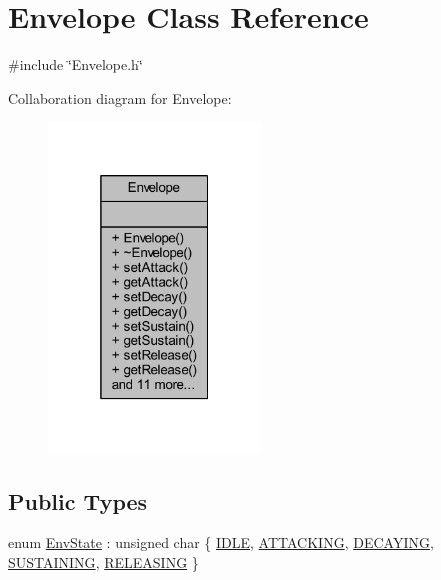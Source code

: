 \hypertarget{class_envelope}{}\section{Envelope Class Reference}
\label{class_envelope}


{\ttfamily \#include \char`\"{}Envelope.\+h\char`\"{}}



Collaboration diagram for Envelope\+:
\nopagebreak
\begin{figure}[H]
\begin{center}
\leavevmode
\includegraphics[width=160pt]{d6/d56/class_envelope__coll__graph}
\end{center}
\end{figure}
\subsection*{Public Types}
\begin{DoxyCompactItemize}
\item 
enum \hyperlink{class_envelope_a16c15d3d555a1a27869f48696f430d5f}{Env\+State} \+: unsigned char \{ \newline
\hyperlink{class_envelope_a16c15d3d555a1a27869f48696f430d5fab143de029e25fdce311f70afa35e5543}{I\+D\+LE}, 
\hyperlink{class_envelope_a16c15d3d555a1a27869f48696f430d5fa95ea9b4e93c89d0cdd585c8722fbfe5b}{A\+T\+T\+A\+C\+K\+I\+NG}, 
\hyperlink{class_envelope_a16c15d3d555a1a27869f48696f430d5fa6aebe1557244f4bfb6ab954708bf03c1}{D\+E\+C\+A\+Y\+I\+NG}, 
\hyperlink{class_envelope_a16c15d3d555a1a27869f48696f430d5fae13513569233289e2ed7756092794956}{S\+U\+S\+T\+A\+I\+N\+I\+NG}, 
\newline
\hyperlink{class_envelope_a16c15d3d555a1a27869f48696f430d5faace0b1e9ab9462b2c680c7203c98ef0e}{R\+E\+L\+E\+A\+S\+I\+NG}
 \}
\end{DoxyCompactItemize}
